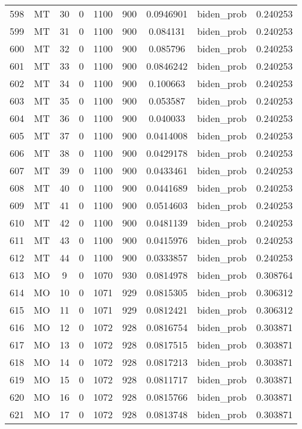 \documentclass[12pt,a4paper]{article}
\begin{document}
\begin{tabular}{r|cccccccc}
	598 & MT & 30 & 0 & 1100 & 900 & 0.0946901 & biden\_prob & 0.240253 \\
	599 & MT & 31 & 0 & 1100 & 900 & 0.084131 & biden\_prob & 0.240253 \\
	600 & MT & 32 & 0 & 1100 & 900 & 0.085796 & biden\_prob & 0.240253 \\
	601 & MT & 33 & 0 & 1100 & 900 & 0.0846242 & biden\_prob & 0.240253 \\
	602 & MT & 34 & 0 & 1100 & 900 & 0.100663 & biden\_prob & 0.240253 \\
	603 & MT & 35 & 0 & 1100 & 900 & 0.053587 & biden\_prob & 0.240253 \\
	604 & MT & 36 & 0 & 1100 & 900 & 0.040033 & biden\_prob & 0.240253 \\
	605 & MT & 37 & 0 & 1100 & 900 & 0.0414008 & biden\_prob & 0.240253 \\
	606 & MT & 38 & 0 & 1100 & 900 & 0.0429178 & biden\_prob & 0.240253 \\
	607 & MT & 39 & 0 & 1100 & 900 & 0.0433461 & biden\_prob & 0.240253 \\
	608 & MT & 40 & 0 & 1100 & 900 & 0.0441689 & biden\_prob & 0.240253 \\
	609 & MT & 41 & 0 & 1100 & 900 & 0.0514603 & biden\_prob & 0.240253 \\
	610 & MT & 42 & 0 & 1100 & 900 & 0.0481139 & biden\_prob & 0.240253 \\
	611 & MT & 43 & 0 & 1100 & 900 & 0.0415976 & biden\_prob & 0.240253 \\
	612 & MT & 44 & 0 & 1100 & 900 & 0.0333857 & biden\_prob & 0.240253 \\
	613 & MO & 9 & 0 & 1070 & 930 & 0.0814978 & biden\_prob & 0.308764 \\
	614 & MO & 10 & 0 & 1071 & 929 & 0.0815305 & biden\_prob & 0.306312 \\
	615 & MO & 11 & 0 & 1071 & 929 & 0.0812421 & biden\_prob & 0.306312 \\
	616 & MO & 12 & 0 & 1072 & 928 & 0.0816754 & biden\_prob & 0.303871 \\
	617 & MO & 13 & 0 & 1072 & 928 & 0.0817515 & biden\_prob & 0.303871 \\
	618 & MO & 14 & 0 & 1072 & 928 & 0.0817213 & biden\_prob & 0.303871 \\
	619 & MO & 15 & 0 & 1072 & 928 & 0.0811717 & biden\_prob & 0.303871 \\
	620 & MO & 16 & 0 & 1072 & 928 & 0.0815766 & biden\_prob & 0.303871 \\
	621 & MO & 17 & 0 & 1072 & 928 & 0.0813748 & biden\_prob & 0.303871 \\

\end{tabular}
\end{document}
